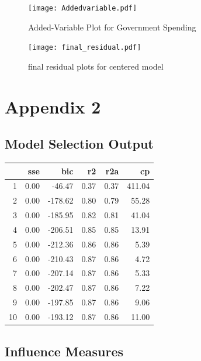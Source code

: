 \documentclass[12pt]{article}
\begin{document}
\begin{figure}
	\centering
	\texttt{[image: Addedvariable.pdf]}
	\caption{Added-Variable Plot for Government Spending}
	\label{fig:added}
\end{figure}

\begin{figure}
  \centering
    \texttt{[image: final\_residual.pdf]}
  \caption{final residual plots for centered model}
  \label{fig:final_residual}
\end{figure}



\newpage

\section{Appendix 2}

\subsection{Model Selection Output}
\begin{table}[ht]
	\centering
	\begin{tabular}{rrrrrr}
		\hline
		& sse & bic & r2 & r2a & cp \\
		\hline
		1 & 0.00 & -46.47 & 0.37 & 0.37 & 411.04 \\
		2 & 0.00 & -178.62 & 0.80 & 0.79 & 55.28 \\
		3 & 0.00 & -185.95 & 0.82 & 0.81 & 41.04 \\
		4 & 0.00 & -206.51 & 0.85 & 0.85 & 13.91 \\
		5 & 0.00 & -212.36 & 0.86 & 0.86 & 5.39 \\
		6 & 0.00 & -210.43 & 0.87 & 0.86 & 4.72 \\
		7 & 0.00 & -207.14 & 0.87 & 0.86 & 5.33 \\
		8 & 0.00 & -202.47 & 0.87 & 0.86 & 7.22 \\
		9 & 0.00 & -197.85 & 0.87 & 0.86 & 9.06 \\
		10 & 0.00 & -193.12 & 0.87 & 0.86 & 11.00 \\
		\hline
	\end{tabular}
\end{table}

\subsection{Influence Measures}
\end{document}
